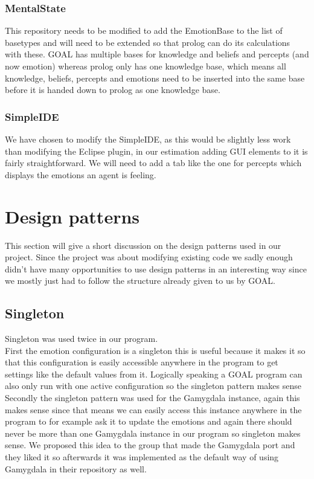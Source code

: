 \documentclass[]{article}
\begin{document}
\subsubsection{MentalState}
This repository needs to be modified to add the EmotionBase to the list of basetypes and will need to be extended so that prolog can do its calculations with these. GOAL has multiple bases for knowledge and beliefs and percepts (and now emotion) whereas prolog only has one knowledge base, which means all knowledge, beliefs, percepts and emotions need to be inserted into the same base before it is handed down to prolog as one knowledge base. \\

\subsubsection{SimpleIDE}
We have chosen to modify the SimpleIDE, as this would be slightly less work than modifying the Eclipse plugin, in our estimation adding GUI elements to it is fairly straightforward. We will need to add a tab like the one for percepts which displays the emotions an agent is feeling.

\section{Design patterns}
This section will give a short discussion on the design patterns used in our project. Since the project was about modifying existing code we sadly enough didn't have many opportunities to use design patterns in an interesting way since we mostly just had to follow the structure already given to us by GOAL.

\subsection{Singleton}
Singleton was used twice in our program.
\\First the emotion configuration is a singleton this is useful because it makes it so that this configuration is easily accessible anywhere in the program to get settings like the default values from it. Logically speaking a GOAL program can also only run with one active configuration so the singleton pattern makes sense \\ 
Secondly the singleton pattern was used for the Gamygdala instance, again this makes sense since that means we can easily access this instance anywhere in the program to for example ask it to update the emotions and again there should never be more than one Gamygdala instance in our program so singleton makes sense. We proposed this idea to the group that made the Gamygdala port and they liked it so afterwards it was implemented as the default way of using Gamygdala in their repository as well.
\end{document}
